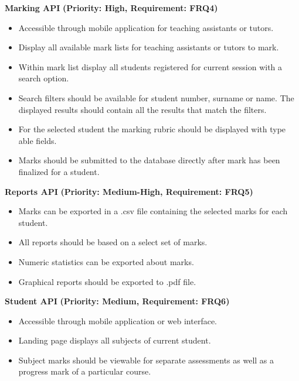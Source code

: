 \documentclass[12pt]{article}
\begin{document}
		\vspace{0.15in}
		
		\textbf{Marking API}
		\textbf{(Priority: High, Requirement: FRQ4)}
		\begin{itemize}
			\item Accessible through mobile application for teaching assistants or tutors.
			\item Display all available mark lists for teaching assistants or tutors to mark.
			\item Within mark list display all students registered for current session with a search option.
			\item Search filters should be available for student number, surname or name. The displayed results should contain all the results that match the filters.
			\item For the selected student the marking rubric should be displayed with type able fields.
			\item Marks should be submitted to the database directly after mark has been finalized for a student.
		\end{itemize}
		
		\vspace{0.15in}
		
		\textbf{Reports API}
		\textbf{(Priority: Medium-High, Requirement: FRQ5)}
		\begin{itemize}
			\item Marks can be exported in a .csv file containing the selected marks for each student.
			\item All reports should be based on a select set of marks.
			\item Numeric statistics can be exported about marks.
			\item Graphical reports should be exported to .pdf file.
		\end{itemize}
		
		\vspace{0.2in}
		
		\textbf{Student API}
		\textbf{(Priority: Medium, Requirement: FRQ6)}
		\begin{itemize}
			\item Accessible through mobile application or web interface.
			\item Landing page displays all subjects of current student.
			\item Subject marks should be viewable for separate assessments as well as a progress mark of a particular course.
		\end{itemize}
		
\end{document}
